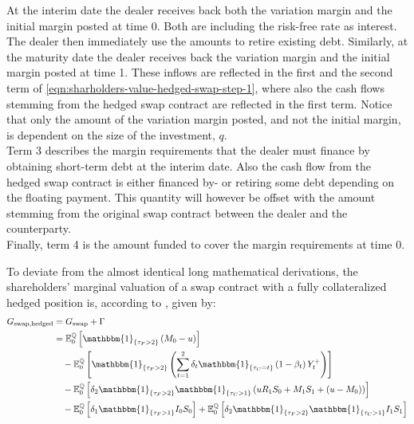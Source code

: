 \documentclass[main.tex]{subfiles}
\begin{document}
        At the interim date the dealer receives back both the variation margin and the initial margin posted at time 0.
        Both are including the risk-free rate as interest.
        The dealer then immediately use the amounts to retire existing debt.
        Similarly, at the maturity date the dealer receives back the variation margin and the initial margin posted at time 1.
        These inflows are reflected in the first and the second term of \cref{eqn:sharholders-value-hedged-swap-step-1},
        where also the cash flows stemming from the hedged swap contract are reflected in the first term.
        Notice that only the amount of the variation margin posted,
        and not the initial margin,
        is dependent on the size of the investment, $q$.
        \\
        Term 3 describes the margin requirements that the dealer must finance by obtaining short-term debt at the interim date.
        Also the cash flow from the hedged swap contract is either financed by- or retiring some debt depending on the floating payment.
        This quantity will however be offset with the amount stemming from the original swap contract between the dealer and the counterparty.
        \\
        Finally, term 4 is the amount funded to cover the margin requirements at time 0.

        To deviate from the almost identical long mathematical derivations,
        the shareholders' marginal valuation of a swap contract with a fully collateralized hedged position is, according to \textcite{ADS2018}, given by:
        \begin{align}
            G_{\text{swap,hedged}} &= G_{\text{swap}} + \Gamma
            \\
            &=
            \mathbb{E}_{0}^{\rnmeasure}\left[
                \mathbbm{1}_{\{\tau_{F}>2\}}
                \left(
                    M_0 - u
                \right)
            \right]
            \nonumber
            \\
            &\quad-
            \mathbb{E}_{0}^{\rnmeasure}\left[
                \mathbbm{1}_{\{\tau_{F}>2\}}
                \left(
                    \sum_{t=1}^{2} \delta_{t} \mathbbm{1}_{\{\tau_{C}=t\}}\left(1-\beta_t\right)Y_{t}^{+}
                \right)
            \right]
            \nonumber
            \\
            &\quad-
            \mathbb{E}_{0}^{\rnmeasure}\left[
                \delta_2 \mathbbm{1}_{\{\tau_{F}>2\}} \mathbbm{1}_{\{\tau_{C}>1\}}
                \left(
                    u R_{1} S_{0} + M_{1} S_{1} + (u - M_0)
                \right)
            \right]
            \nonumber
            \\
            &\quad-
            \mathbb{E}_{0}^{\rnmeasure}\left[
                \delta_1 \mathbbm{1}_{\{\tau_{F}>1\}}
                I_0 S_0 
            \right] 
            +
            \mathbb{E}_{0}^{\rnmeasure}\left[
                \delta_2 \mathbbm{1}_{\{\tau_{F}>2\}} \mathbbm{1}_{\{\tau_{C}>1\}}
                I_1 S_1 
            \right] 
        \end{align}
\end{document}
